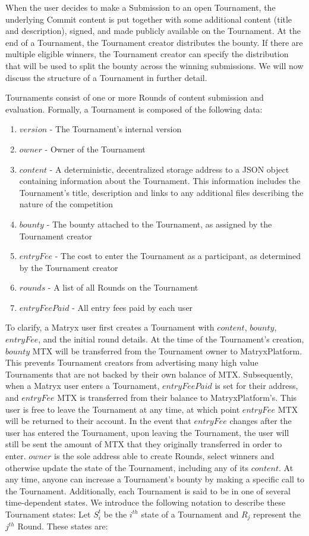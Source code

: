 \documentclass[a4paper, 10pt, conference]{ieeeconf}      %
\begin{document}
When the user decides to make a Submission to an open Tournament, the underlying Commit content is put together with some additional content (title and description), signed, and made publicly available on the Tournament.
At the end of a Tournament, the Tournament creator distributes the bounty. If there are multiple eligible winners, the Tournament creator can specify the distribution that will be used to split the bounty across the winning submissions. We will now discuss the structure of a Tournament in further detail.

Tournaments consist of one or more Rounds of content submission and evaluation. 
Formally, a Tournament is composed of the following data:
\begin{enumerate}
\item $version$ - The Tournament's internal version
\item $owner$ - Owner of the Tournament
\item $content$ - A deterministic, decentralized storage address to a JSON object containing information about the Tournament. This information includes the Tournament's title, description and links to any additional files describing the nature of the competition
\item $bounty$ - The bounty attached to the Tournament, as assigned by the Tournament creator
\item $entryFee$ - The cost to enter the Tournament as a participant, as determined by the Tournament creator
\item $rounds$ - A list of all Rounds on the Tournament
\item $entryFeePaid$ - All entry fees paid by each user
\end{enumerate}

To clarify, a Matryx user first creates a Tournament with $content$, $bounty$, $entryFee$, and the initial round details. At the time of the Tournament's creation, $bounty$ MTX will be transferred from the Tournament owner to MatryxPlatform. This prevents Tournament creators from advertising many high value Tournaments that are not backed by their own balance of MTX. Subsequently, when a Matryx user enters a Tournament, $entryFeePaid$ is set for their address, and $entryFee$ MTX is transferred from their balance to MatryxPlatform's. This user is free to leave the Tournament at any time, at which point $entryFee$ MTX will be returned to their account. In the event that $entryFee$ changes after the user has entered the Tournament, upon leaving the Tournament, the user will still be sent the amount of MTX that they originally transferred in order to enter. $owner$ is the sole address able to create Rounds, select winners and otherwise update the state of the Tournament, including any of its $content$. At any time, anyone can increase a Tournament's bounty by making a specific call to the Tournament. Additionally, each Tournament is said to be in one of several time-dependent states. We introduce the following notation to describe these Tournament states: Let $S_i^t$ be the $i^{th}$ state of a Tournament and $R_j$ represent the $j^{th}$ Round. These states are:
\end{document}
